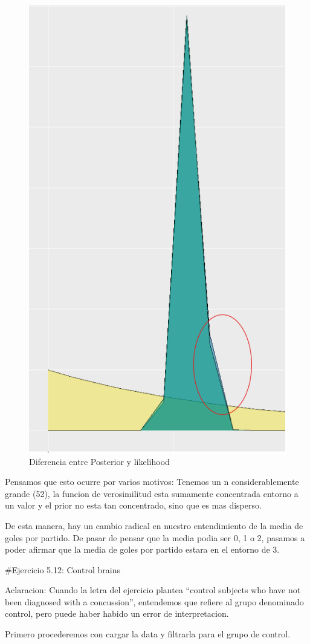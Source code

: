 \documentclass[
  letterpaper,
  DIV=11,
  numbers=noendperiod]{scrartcl}
\begin{document}
\begin{figure}[H]

{\centering \includegraphics[width=0.6\linewidth,height=0.4\textheight]{a.png}

}

\caption{Diferencia entre Posterior y likelihood}

\end{figure}%

Pensamos que esto ocurre por varios motivos: Tenemos un n
considerablemente grande (52), la funcion de verosimilitud esta
sumamente concentrada entorno a un valor y el prior no esta tan
concentrado, sino que es mas disperso.

De esta manera, hay un cambio radical en nuestro entendimiento de la
media de goles por partido. De pasar de pensar que la media podia ser 0,
1 o 2, pasamos a poder afirmar que la media de goles por partido estara
en el entorno de 3.

\#Ejercicio 5.12: Control brains

Aclaracion: Cuando la letra del ejercicio plantea ``control subjects who
have not been diagnosed with a concussion'', entendemos que refiere al
grupo denominado control, pero puede haber habido un error de
interpretacion.

Primero procederemos con cargar la data y filtrarla para el grupo de
control.
\end{document}
